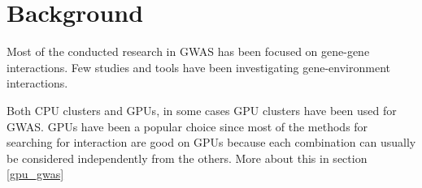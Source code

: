\documentclass[10pt,a4paper]{report}
\begin{document}
\clearpage
\chapter{Background}

Most of the conducted research in GWAS has been focused on gene-gene interactions. Few studies and tools have been investigating gene-environment interactions.

Both CPU clusters\cite{biforce} and GPUs\cite{gwis,gboost,gmdr_gpu,cuda_lr,genie_2012,plink_gpu}, in some cases GPU clusters\cite{gwis_conf} have been used for GWAS. GPUs have been a popular choice since most of the methods for searching for interaction are good on GPUs because each combination can usually be considered independently from the others. More about this in section \ref{gpu_gwas}
\end{document}
